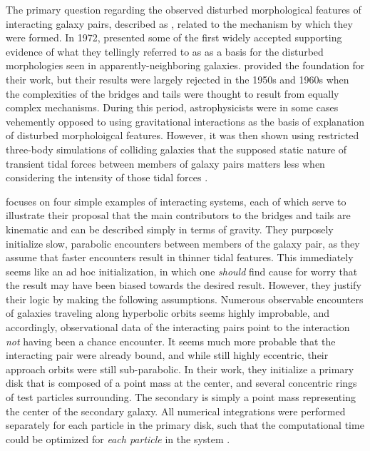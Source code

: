 The primary question regarding the observed disturbed morphological features
of interacting galaxy pairs,
described as , related to the mechanism by which they
were formed.
In 1972, \citet{Toomre1972} presented some of the first widely
accepted supporting
evidence of what they tellingly referred to as 
as a basis for the disturbed morphologies seen in apparently-neighboring
galaxies. \citet{German} provided the
foundation for their work, but their results were largely rejected in the 1950s
and 1960s when the complexities of the bridges and tails were thought to
result from equally complex mechanisms.
During this period, astrophysicists were in some cases vehemently
opposed to using gravitational interactions as the basis of explanation of
disturbed morpholoigcal features. However, it was then
shown using restricted three-body simulations of colliding galaxies
that the supposed static nature of transient tidal forces between
members of galaxy pairs matters less when considering the intensity
of those tidal forces \cite{Toomre1972}.


\citet{Toomre1972} focuses on four simple examples of interacting systems, each
of which serve to illustrate their proposal that the main contributors to the
bridges and tails are kinematic and can be described simply in terms of gravity.
They purposely initialize slow, parabolic encounters between members of the
galaxy pair, as they assume that faster encounters result in thinner tidal
features. This immediately seems like an ad hoc initialization, in which
one \textit{should} find cause for worry that the result may have been biased
towards the desired result. However, they justify their logic by making the
following assumptions. Numerous observable encounters of galaxies traveling along
hyperbolic orbits seems highly improbable, and accordingly, observational data
of the interacting pairs point to the interaction \textit{not} having been a
chance encounter. It seems much more probable that the interacting pair were
already bound, and while still highly eccentric, their approach orbits were
still sub-parabolic. In their work, they initialize a primary disk that
is composed of a point mass at the center, and several concentric rings of
test particles surrounding. The secondary  is simply a point mass
representing the center of the secondary galaxy. All numerical integrations were
performed separately for each particle in the primary disk, such that the
computational time could be optimized for \textit{each particle} in the system
\cite{Toomre1972}.

